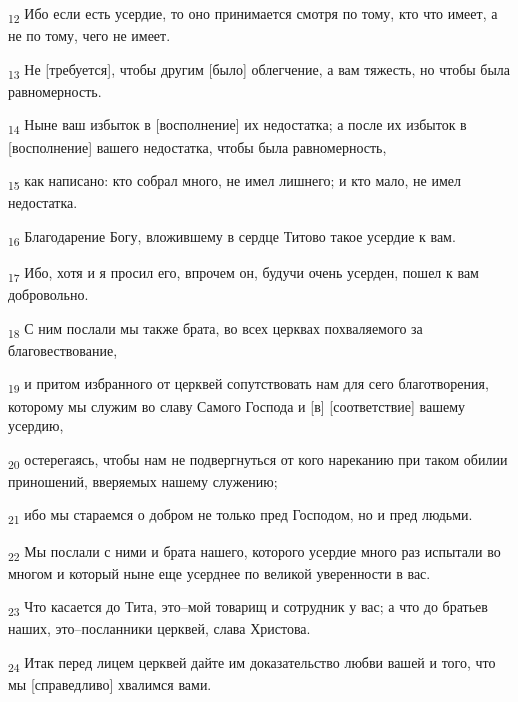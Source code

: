 \begin{tcolorbox}
\textsubscript{12} Ибо если есть усердие, то оно принимается смотря по тому, кто что имеет, а не по тому, чего не имеет.
\end{tcolorbox}
\begin{tcolorbox}
\textsubscript{13} Не [требуется], чтобы другим [было] облегчение, а вам тяжесть, но чтобы была равномерность.
\end{tcolorbox}
\begin{tcolorbox}
\textsubscript{14} Ныне ваш избыток в [восполнение] их недостатка; а после их избыток в [восполнение] вашего недостатка, чтобы была равномерность,
\end{tcolorbox}
\begin{tcolorbox}
\textsubscript{15} как написано: кто собрал много, не имел лишнего; и кто мало, не имел недостатка.
\end{tcolorbox}
\begin{tcolorbox}
\textsubscript{16} Благодарение Богу, вложившему в сердце Титово такое усердие к вам.
\end{tcolorbox}
\begin{tcolorbox}
\textsubscript{17} Ибо, хотя и я просил его, впрочем он, будучи очень усерден, пошел к вам добровольно.
\end{tcolorbox}
\begin{tcolorbox}
\textsubscript{18} С ним послали мы также брата, во всех церквах похваляемого за благовествование,
\end{tcolorbox}
\begin{tcolorbox}
\textsubscript{19} и притом избранного от церквей сопутствовать нам для сего благотворения, которому мы служим во славу Самого Господа и [в] [соответствие] вашему усердию,
\end{tcolorbox}
\begin{tcolorbox}
\textsubscript{20} остерегаясь, чтобы нам не подвергнуться от кого нареканию при таком обилии приношений, вверяемых нашему служению;
\end{tcolorbox}
\begin{tcolorbox}
\textsubscript{21} ибо мы стараемся о добром не только пред Господом, но и пред людьми.
\end{tcolorbox}
\begin{tcolorbox}
\textsubscript{22} Мы послали с ними и брата нашего, которого усердие много раз испытали во многом и который ныне еще усерднее по великой уверенности в вас.
\end{tcolorbox}
\begin{tcolorbox}
\textsubscript{23} Что касается до Тита, это--мой товарищ и сотрудник у вас; а что до братьев наших, это--посланники церквей, слава Христова.
\end{tcolorbox}
\begin{tcolorbox}
\textsubscript{24} Итак перед лицем церквей дайте им доказательство любви вашей и того, что мы [справедливо] хвалимся вами.
\end{tcolorbox}
